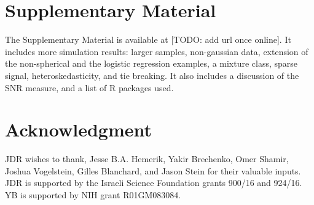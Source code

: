 \documentclass[oupdraft]{bio}
\begin{document}
\section{Supplementary Material}
The Supplementary Material is available at [TODO: add url once online]. 
It includes more simulation results: larger samples, non-gaussian data, extension of the non-spherical and the logistic regression examples, a mixture class, sparse signal, heteroskedasticity, and tie breaking. It also includes a discussion of the SNR measure, and a list of R packages used. 



\section*{Acknowledgment}
JDR wishes to thank, Jesse B.A. Hemerik, Yakir Brechenko, Omer Shamir, Joshua Vogelstein, Gilles Blanchard, and Jason Stein for their valuable inputs. 
JDR is supported by the Israeli Science Foundation grants 900/16 and 924/16. 
YB is supported by NIH grant R01GM083084.






\end{document}
